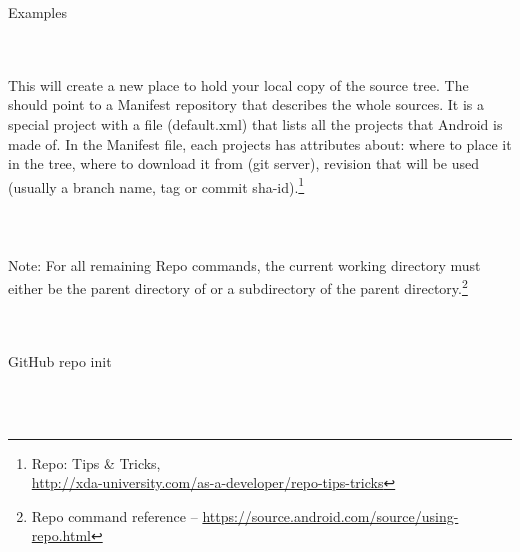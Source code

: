 \noindent \begin{bf}Examples\end{bf}
\\
\\
This will create a new place to hold your local copy of the source
tree.  The  should point to a Manifest repository that
describes the whole sources.  It is a special project with a file
(default.xml) that lists all the projects that Android is made of.
In the Manifest file, each projects has attributes about: where to
place it in the tree, where to download it from (git server),
revision that will be used (usually a branch name, tag or commit
sha-id).\footnote{Repo: Tips \& Tricks,\\
\href{http://xda-university.com/as-a-developer/repo-tips-tricks}{http://xda-university.com/as-a-developer/repo-tips-tricks}}
\\
\\
\indent{}
\\
\\
\noindent Note: For all remaining Repo commands, the current working
directory must either be the parent directory of 
or a subdirectory of the parent directory.\footnote{Repo command reference --
\href{https://source.android.com/source/using-repo.html\#forall}{https://source.android.com/source/using-repo.html}}\\
\\
\\


\newpage
\noindent \begin{bf}GitHub repo init\end{bf}
\\
\\
\noindent{}

